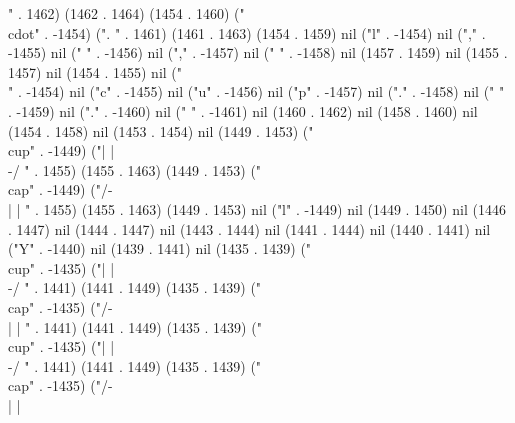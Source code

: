 " . 1462) (1462 . 1464) (1454 . 1460) ("\\cdot" . -1454) (".
" . 1461) (1461 . 1463) (1454 . 1459) nil ("l" . -1454) nil ("," . -1455) nil (" " . -1456) nil ("," . -1457) nil (" " . -1458) nil (1457 . 1459) nil (1455 . 1457) nil (1454 . 1455) nil ("\\" . -1454) nil ("c" . -1455) nil ("u" . -1456) nil ("p" . -1457) nil ("." . -1458) nil (" " . -1459) nil ("." . -1460) nil (" " . -1461) nil (1460 . 1462) nil (1458 . 1460) nil (1454 . 1458) nil (1453 . 1454) nil (1449 . 1453) ("\\cup" . -1449) ("| |
\\-/
" . 1455) (1455 . 1463) (1449 . 1453) ("\\cap" . -1449) ("/-\\
| |
" . 1455) (1455 . 1463) (1449 . 1453) nil ("l" . -1449) nil (1449 . 1450) nil (1446 . 1447) nil (1444 . 1447) nil (1443 . 1444) nil (1441 . 1444) nil (1440 . 1441) nil ("Y" . -1440) nil (1439 . 1441) nil (1435 . 1439) ("\\cup" . -1435) ("| |
\\-/
" . 1441) (1441 . 1449) (1435 . 1439) ("\\cap" . -1435) ("/-\\
| |
" . 1441) (1441 . 1449) (1435 . 1439) ("\\cup" . -1435) ("| |
\\-/
" . 1441) (1441 . 1449) (1435 . 1439) ("\\cap" . -1435) ("/-\\
| |
